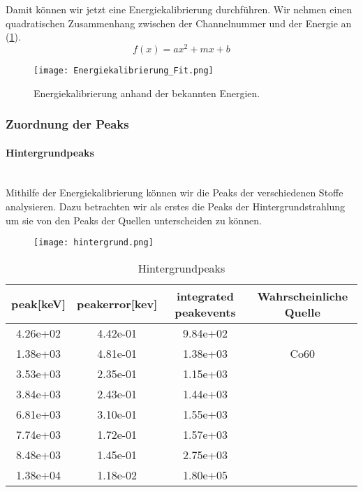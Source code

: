 \documentclass[]{article}
\begin{document}
	Damit können wir jetzt eine Energiekalibrierung durchführen. Wir nehmen einen quadratischen Zusammenhang zwischen der Channelnummer und der Energie an (\ref{fig:energiekalibrierung-fit}).
	\begin{equation}
	f(x)=ax^2+mx+b
	\end{equation}
	\begin{figure}
		\centering
		\texttt{[image: Energiekalibrierung\_Fit.png]}
		\caption{Energiekalibrierung anhand der bekannten Energien.}
		\label{fig:energiekalibrierung-fit}
	\end{figure}
	
	\subsubsection{Zuordnung der Peaks}
	\paragraph{Hintergrundpeaks}\mbox{} \\
	Mithilfe der Energiekalibrierung können wir die Peaks der verschiedenen Stoffe analysieren. Dazu betrachten wir als erstes die Peaks der Hintergrundstrahlung um sie von den Peaks der Quellen unterscheiden zu können.
	\begin{figure}[H]
		\centering
		\texttt{[image: hintergrund.png]}
		\caption{}
		\label{fig:hintergrund}
	\end{figure}
	
	\begin{table}[H]
		\centering
		\begin{tabular}{|c|c|c|c|}
			\hline
			peak[keV] & peakerror[kev] & integrated peakevents &Wahrscheinliche Quelle\\ \hline\hline
			4.26e+02 & 4.42e-01 & 9.84e+02 &\\ \hline
			1.38e+03 & 4.81e-01 & 1.38e+03 & Co60\\ \hline
			3.53e+03 & 2.35e-01 & 1.15e+03 &\\ \hline
			3.84e+03 & 2.43e-01 & 1.44e+03 &\\ \hline
			6.81e+03 & 3.10e-01 & 1.55e+03 &\\ \hline
			7.74e+03 & 1.72e-01 & 1.57e+03 &\\ \hline
			8.48e+03 & 1.45e-01 & 2.75e+03 &\\ \hline
			1.38e+04 & 1.18e-02 & 1.80e+05 &\\ \hline
			
		\end{tabular}
		\caption{Hintergrundpeaks \label{tab:hintergrundpeaks}}
	\end{table}
	
\end{document}
